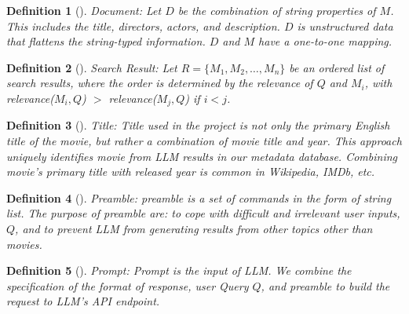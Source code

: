 \documentclass[journal]{IEEEtran}
\theoremstyle{mydefstyle}
\newtheorem{definition}{Definition}[section]
\begin{document}
\begin{adjustwidth}{0.75cm}{} \begin{definition}[]
\textit{Document:} Let \( D \) be the combination of string properties of \( M \). This includes the title, directors, actors, and description. \( D \) is unstructured data that flattens the string-typed information. \( D \) and \( M \) have a one-to-one mapping.
\end{definition} \end{adjustwidth}

\begin{adjustwidth}{0.75cm}{} \begin{definition}[]
\textit{Search Result:} Let \( R = \{M_1, M_2, \ldots, M_n\} \) be an ordered list of search results, where the order is determined by the relevance of \( Q \) and \( M_i \), with relevance(\( M_i, Q \)) \(>\) relevance(\( M_j, Q \)) if \( i < j \).
\end{definition} \end{adjustwidth}

\begin{adjustwidth}{0.75cm}{} \begin{definition}[]
\textit{Title:} Title used in the project is not only the primary English title of the movie, but rather a combination of movie title and year. This approach uniquely identifies movie from LLM results in our metadata database. Combining movie's primary title with released year is common in Wikipedia, IMDb, etc.
\end{definition} \end{adjustwidth}

\begin{adjustwidth}{0.75cm}{} \begin{definition}[]
\textit{Preamble:} preamble is a set of commands in the form of string list. The purpose of preamble are: to cope with difficult and irrelevant user inputs, \(Q\), and to prevent LLM from generating results from other topics other than movies.
\end{definition} \end{adjustwidth}

\begin{adjustwidth}{0.75cm}{} \begin{definition}[]
\textit{Prompt:} Prompt is the input of LLM. We combine the specification of the format of response, user Query \(Q\), and preamble to build the request to LLM's API endpoint.
\end{definition} \end{adjustwidth}
\end{document}
